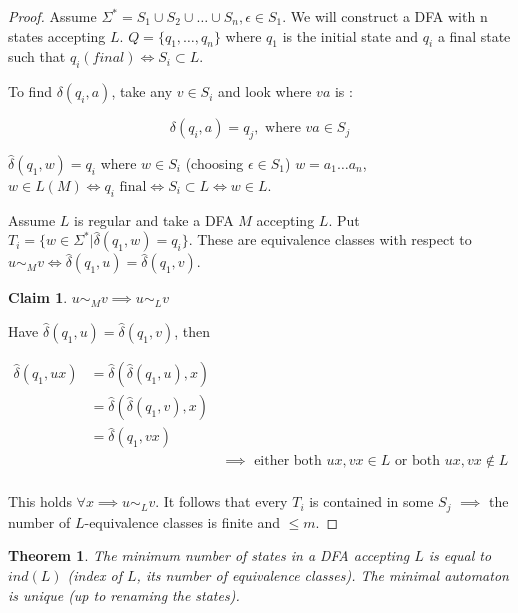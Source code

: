 \documentclass[a4paper,11pt]{article}
\newtheorem{thm}{Theorem}[section]
\newtheorem*{claim}{Claim}
\begin{document}
\begin{proof}
  Assume $\Sigma^* = S_1 \cup S_2 \cup \dots \cup S_n, \epsilon \in S_1$. We
  will construct a DFA with n states accepting $L$. $Q = \{q_1,\dots,q_n\}$
  where $q_1$ is the initial state and $q_i$ a final state such that $q_i(final)
  \iff S_i \subset L$.

  To find $\delta(q_i,a)$, take any $v \in S_i$ and look where $va$ is :

  \[
    \delta(q_i,a) = q_j, \text{ where } va \in S_j
  \]

  $\widehat{\delta}(q_1,w) = q_i$ where $w \in S_i$ (choosing $\epsilon \in
  S_1$) $w = a_1 \dots a_n$, $w \in L(M) \iff q_i \text{ final} \iff S_i \subset
  L \iff w \in L$.

  Assume $L$ is regular and take a DFA $M$ accepting $L$. Put $T_i = \{w \in
  \Sigma^* | \widehat{\delta}(q_1,w) = q_i\}$. These are equivalence classes
  with respect to $u \sim_M v \iff \widehat{\delta}(q_1,u) =
  \widehat{\delta}(q_1,v)$.

  \begin{claim}
    $u \sim_M v \implies u \sim_L v$
  \end{claim}

  Have $\widehat{\delta}(q_1,u) = \widehat{\delta}(q_1,v)$, then

  \begin{align*}
    \widehat{\delta}(q_1,ux) &= \widehat{\delta}(\widehat{\delta}(q_1,u),x) \\
                             &= \widehat{\delta}(\widehat{\delta}(q_1,v),x) \\
                             &= \widehat{\delta}(q_1,vx) \\
                             && \implies \text{ either both $ux,vx \in L$ or both $ux,vx \not \in L$} \\
  \end{align*}

  This holds $\forall x \implies u \sim_L v$. It follows that every $T_i$ is
  contained in some $S_j$ $\implies$ the number of $L$-equivalence classes is
  finite and $\leq m$.
\end{proof}

\begin{thm}
  The minimum number of states in a DFA accepting $L$ is equal to $ind(L)$
  (index of $L$, its number of equivalence classes). The minimal automaton is
  unique (up to renaming the states).
\end{thm}
\end{document}
